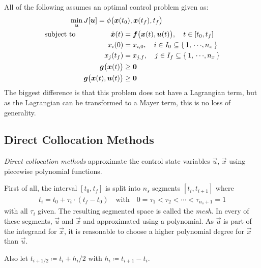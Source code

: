 		All of the following assumes an optimal control problem given as:
		\begin{align*}
			\min_{\bm{u}}           & \, J[\bm{u}] = \phi\big(\bm{x}(t_0), \bm{x}(t_f), t_f\big) \\
			\mathrm{subject~to}\quad & \,
			\begin{alignedat}[t]{2}
				\dot{\bm{x}}(t) &= \bm{f}\big(\bm{x}(t), \bm{u}(t)\big),\quad t \in [t_0, t_f] \\
				x_i(0) &= x_{i, 0},\quad i \in I_0 \subseteq \{\, 1,\,\cdots\!,n_x \,\} \\
				x_j(t_f) &= x_{j, f},\quad j \in I_f \subseteq \{\, 1,\,\cdots\!,n_x \,\} \\
				\bm{g}\big(\bm{x}(t)\big) &\geq \bm{0} \\
				\bm{g}\big(\bm{x}(t), \bm{u}(t)\big) &\geq \bm{0}
			\end{alignedat}
		\end{align*}
		The biggest difference is that this problem does not have a Lagrangian term, but as the Lagrangian can be transformed to a Mayer term, this is no loss of generality.

		\subsection{Direct Collocation Methods}
			\emph{Direct collocation methods} approximate the control state variables \(\vec{u}\), \(\vec{x}\) using piecewise polynomial functions.

			First of all, the interval \( [t_0, t_f] \) is split into \(n_s\) segments \( [t_i, t_{i + 1}] \) where
			\begin{align*}
				t_i = t_0 + \tau_i \cdot (t_f - t_0) \quad\text{with}\quad 0 = \tau_1 < \tau_2 < \cdots < \tau_{n_s + 1} = 1
			\end{align*}
			with all \(\tau_i\) given. The resulting segmented space is called the \emph{mesh}. In every of these segments, \(\vec{u}\) and \(\vec{x}\) and approximated using a polynomial. As \(\vec{u}\) is part of the integrand for \(\vec{x}\), it is reasonable to choose a higher polynomial degree for \(\vec{x}\) than \(\vec{u}\).

			Also let \( t_{i + 1/2} \coloneqq t_i + h_i / 2 \) with \( h_i \coloneqq t_{i + 1} - t_i \).

